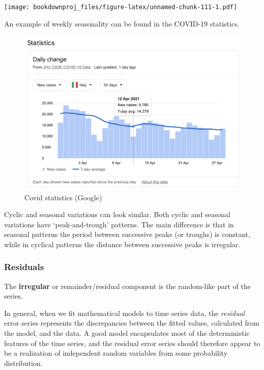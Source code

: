 \documentclass[
]{article}
\begin{document}
\texttt{[image: bookdownproj\_files/figure-latex/unnamed-chunk-111-1.pdf]}

An example of weekly seasonality can be found in the COVID-19 statistics.

\begin{figure}
\includegraphics[width=18.46in]{images/covid-italy} \caption{Covid statistics (Google)}\label{fig:unnamed-chunk-112}
\end{figure}

Cyclic and seasonal variations can look similar. Both cyclic and seasonal variations have `peak-and-trough' patterns. The main difference is that in seasonal patterns the period between successive peaks (or troughs) is constant, while in cyclical patterns the distance between successive peaks is irregular.

\hypertarget{residuals}{%
\subsubsection{Residuals}\label{residuals}}

The \textbf{irregular} or remainder/residual component is the random-like part of the series.

In general, when we fit mathematical models to time series data, the \emph{residual} error series represents the discrepancies between the fitted values, calculated from the model, and the data. A good model encapsulates most of the deterministic features of the time series, and the residual error series should therefore appear to be a realization of independent random variables from some probability distribution.
\end{document}
